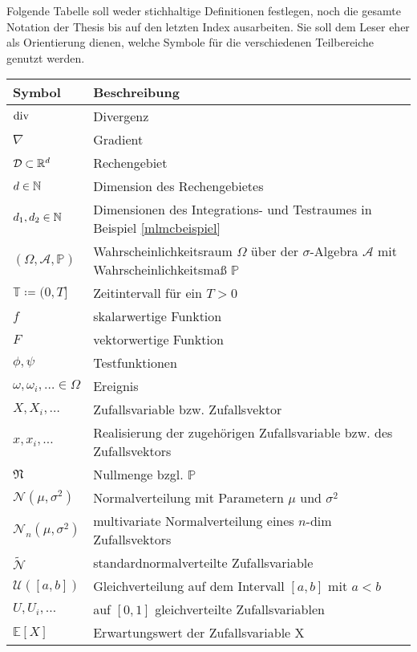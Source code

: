 Folgende Tabelle soll weder stichhaltige Definitionen festlegen, noch die gesamte Notation der Thesis bis auf den letzten Index ausarbeiten. Sie soll dem Leser eher als Orientierung dienen, welche Symbole für die verschiedenen Teilbereiche genutzt werden.

\begin{longtable}[c]{ p{} p{}}
	\hline
	Symbol    & Beschreibung   \\
	\hline
	$ \operatorname{div} $ & Divergenz \\
	$ \nabla $ & Gradient \\
	$ \mathcal{D} \subset \mathbb{R}^d$      & Rechengebiet       \\
	$ d \in \mathbb{N} $      & Dimension des Rechengebietes        \\
	$ d_1, d_2 \in \mathbb{N} $ & Dimensionen des Integrations- und Testraumes in Beispiel \ref{mlmcbeispiel}  \\
	$ (\Omega,\mathcal{A},\mathbb{P}) $       & Wahrscheinlichkeitsraum $ \Omega $ über der $ \sigma $-Algebra $ \mathcal{A} $ mit Wahrscheinlichkeitsmaß $ \mathbb{P} $       \\
	$ \mathbb{T} \coloneqq  (0,T]  $  &  Zeitintervall für ein $ T>0 $       \\
	$ f $ & skalarwertige Funktion \\
	$ F $ & vektorwertige Funktion \\
	$ \phi , \psi $ & Testfunktionen \\
	$ \omega ,\omega_i , \dots \in \Omega $ & Ereignis \\
	$ X , X_i , \dots $ & Zufallsvariable bzw. Zufallsvektor \\
	$ x , x_i , \dots $ & Realisierung der zugehörigen Zufallsvariable bzw. des Zufallsvektors \\
	$ \mathfrak{N} $ & Nullmenge bzgl. $ \mathbb{P} $ \\
	$ \mathcal{N}(\mu,\sigma^2) $ & Normalverteilung mit Parametern $ \mu $ und $ \sigma^2 $ \\
	$ \mathcal{N}_n(\mu,\sigma^2) $ & multivariate Normalverteilung eines $ n $-dim Zufallsvektors\\
	$\widetilde{\mathcal{N}}$ & standardnormalverteilte Zufallsvariable \\
	$ \mathcal{U}([a,b]) $ & Gleichverteilung auf dem Intervall $ [a,b] $ mit $ a<b $ \\
	$ U,U_i,\dots $ &  auf $ [0,1] $  gleichverteilte Zufallsvariablen \\
	$ \mathbb{E}[X] $ & Erwartungswert der Zufallsvariable X \\

\end{longtable}

